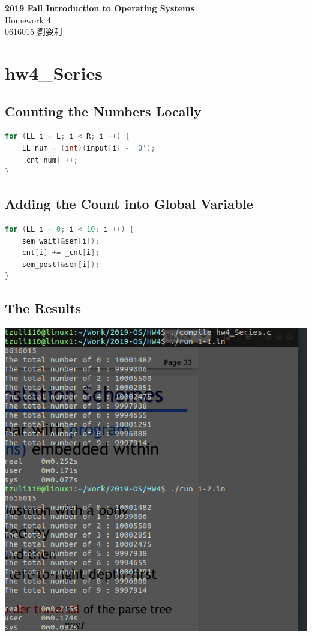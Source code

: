 \documentclass[12pt, a4paper]{article}
\title{
    \textbf{Report Title} \\
    \large Report Subtitle \\
    \small Tracy Liu
    \author Tracy Liu
    \date{}
}
\begin{document}
    \begin{CJK*}{UTF8}{bsmi}

    \begin{center}
        \LARGE\textbf{2019 Fall Introduction to Operating Systems} \\
        \large Homework 4 \\
        \small 0616015 劉姿利 \\
    \end{center}


    \section{hw4\_Series}
        \subsection{Counting the Numbers Locally}
\begin{lstlisting}[language=C++]
for (LL i = L; i < R; i ++) {
    LL num = (int)(input[i] - '0');
    _cnt[num] ++;
}
\end{lstlisting}

        \subsection{Adding the Count into Global Variable}
\begin{lstlisting}[language=C++]
for (LL i = 0; i < 10; i ++) {
    sem_wait(&sem[i]);
    cnt[i] += _cnt[i];
    sem_post(&sem[i]);
}
\end{lstlisting}
        
        \subsection{The Results}
            \includegraphics[width=15cm]{series.png}


\end{CJK*}
\end{document}
